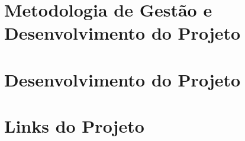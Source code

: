 \documentclass[
    12pt,               %
    openright,          %
    oneside,
    a4paper,            %
    MODELO,             %
    english,            %
    brazil,              %
    pstricks,border=12pt
   ]{ifsp-spo-inf-ctds}
\begin{document}
    \chapter{Metodologia de Gestão e Desenvolvimento
    do Projeto}
    
    
    \chapter{Desenvolvimento do Projeto}
    
    
    
    
    
    
    
    
    
    
    
    
    
    
    
    
    
    
    
   
    \chapter{Links do Projeto}
    
    
    
    
    
    
    

\end{document}
